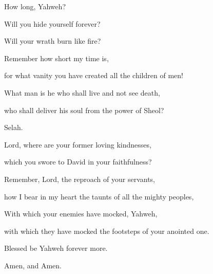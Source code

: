 {\Q {}How long, Yahweh?
\par }{\QB Will you hide yourself forever?
\par }{\QB Will your wrath burn like fire?
\par }{\Q {}Remember how short my time is,
\par }{\QB for what vanity you have created all the children of men!
\par }{\Q {}What man is he who shall live and not see death,
\par }{\QB who shall deliver his soul from the power of Sheol?
\par }{\QS Selah.\par }
{\Q {}Lord, where are your former loving kindnesses,
\par }{\QB which you swore to David in your faithfulness?
\par }{\Q {}Remember, Lord, the reproach of your servants,
\par }{\QB how I bear in my heart the taunts of all the mighty peoples,
\par }{\Q {}With which your enemies have mocked, Yahweh,
\par }{\QB with which they have mocked the footsteps of your anointed one.
\par }{\BB \par }{\Q {}Blessed be Yahweh forever more.
\par }{\Q Amen, and Amen.

}
